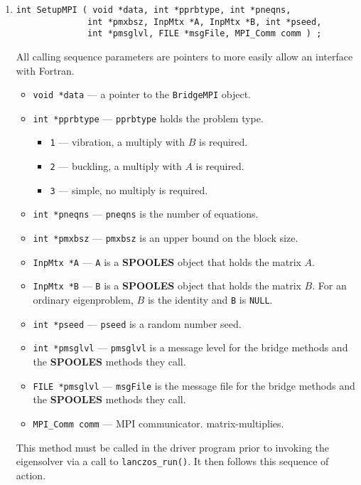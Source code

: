 \begin{enumerate}
\item
\begin{verbatim}
int SetupMPI ( void *data, int *pprbtype, int *pneqns, 
              int *pmxbsz, InpMtx *A, InpMtx *B, int *pseed, 
              int *pmsglvl, FILE *msgFile, MPI_Comm comm ) ;
\end{verbatim}
\noindent All calling sequence parameters are pointers to more
easily allow an interface with Fortran.
\begin{itemize}
\item {\tt void *data} --- a pointer to the {\tt BridgeMPI} object.
\item {\tt int *pprbtype} --- {\tt *pprbtype} holds the problem type.
   \begin{itemize}
   \item {\tt 1} --- vibration, a multiply with $B$ is required.
   \item {\tt 2} --- buckling, a multiply with $A$ is required.
   \item {\tt 3} --- simple, no multiply is required.
   \end{itemize}
\item {\tt int *pneqns} --- {\tt *pneqns} is the number of equations.
\item {\tt int *pmxbsz} --- {\tt *pmxbsz} is an upper bound on the
block size.
\item {\tt InpMtx *A} --- {\tt A} is a {\bf SPOOLES} object that
holds the matrix $A$.
\item {\tt InpMtx *B} --- {\tt B} is a {\bf SPOOLES} object that
holds the matrix $B$. For an ordinary eigenproblem, $B$ is the
identity and {\tt B} is {\tt NULL}.
\item {\tt int *pseed} --- {\tt *pseed} is a random number seed.
\item {\tt int *pmsglvl} --- {\tt *pmsglvl} is a message level for
the bridge methods and the {\bf SPOOLES} methods they call.
\item {\tt FILE *pmsglvl} --- {\tt msgFile} is the message file
for the bridge methods and the {\bf SPOOLES} methods they call.
\item {\tt MPI\_Comm comm} --- MPI communicator.
matrix-multiplies.
\end{itemize}
This method must be called in the driver program prior to invoking
the eigensolver via a call to {\tt lanczos\_run()}.
It then follows this sequence of action.

\end{enumerate}
